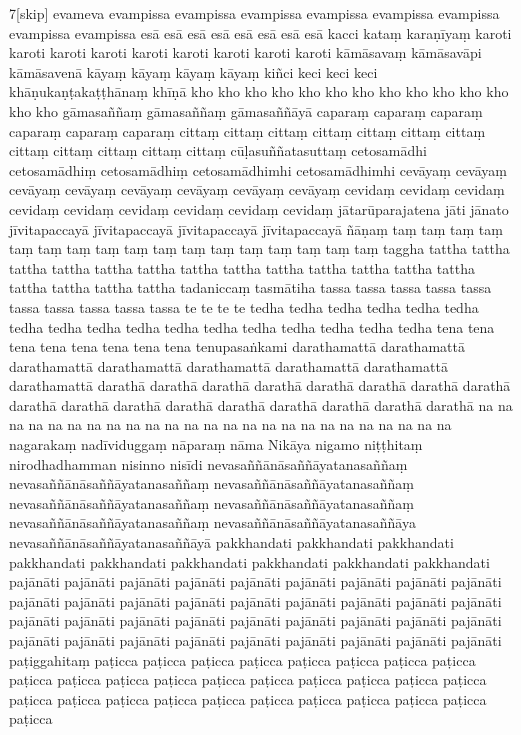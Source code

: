\documentclass[12pt]{article}
\begin{document}
\begin{multicols}{7}[skip]
evameva
evampissa
evampissa
evampissa
evampissa
evampissa
evampissa
evampissa
evampissa
esā
esā
esā
esā
esā
esā
esā
esā
kacci
kataṃ
karaṇīyaṃ
karoti
karoti
karoti
karoti
karoti
karoti
karoti
karoti
karoti
kāmāsavaṃ
kāmāsavāpi
kāmāsavenā
kāyaṃ
kāyaṃ
kāyaṃ
kāyaṃ
kiñci
keci
keci
keci
khāṇukaṇṭakaṭṭhānaṃ
khīṇā
kho
kho
kho
kho
kho
kho
kho
kho
kho
kho
kho
kho
kho
kho
gāmasaññaṃ
gāmasaññaṃ
gāmasaññāyā
caparaṃ
caparaṃ
caparaṃ
caparaṃ
caparaṃ
caparaṃ
cittaṃ
cittaṃ
cittaṃ
cittaṃ
cittaṃ
cittaṃ
cittaṃ
cittaṃ
cittaṃ
cittaṃ
cittaṃ
cittaṃ
cūḷasuññatasuttaṃ
cetosamādhi
cetosamādhiṃ
cetosamādhiṃ
cetosamādhimhi
cetosamādhimhi
cevāyaṃ
cevāyaṃ
cevāyaṃ
cevāyaṃ
cevāyaṃ
cevāyaṃ
cevāyaṃ
cevāyaṃ
cevidaṃ
cevidaṃ
cevidaṃ
cevidaṃ
cevidaṃ
cevidaṃ
cevidaṃ
cevidaṃ
cevidaṃ
jātarūparajatena
jāti
jānato
jīvitapaccayā
jīvitapaccayā
jīvitapaccayā
jīvitapaccayā
ñāṇaṃ
taṃ
taṃ
taṃ
taṃ
taṃ
taṃ
taṃ
taṃ
taṃ
taṃ
taṃ
taṃ
taṃ
taṃ
taṃ
taṃ
taṃ
taggha
tattha
tattha
tattha
tattha
tattha
tattha
tattha
tattha
tattha
tattha
tattha
tattha
tattha
tattha
tattha
tattha
tattha
tadaniccaṃ
tasmātiha
tassa
tassa
tassa
tassa
tassa
tassa
tassa
tassa
tassa
tassa
te
te
te
te
tedha
tedha
tedha
tedha
tedha
tedha
tedha
tedha
tedha
tedha
tedha
tedha
tedha
tedha
tedha
tedha
tedha
tena
tena
tena
tena
tena
tena
tena
tena
tenupasaṅkami
darathamattā
darathamattā
darathamattā
darathamattā
darathamattā
darathamattā
darathamattā
darathamattā
darathā
darathā
darathā
darathā
darathā
darathā
darathā
darathā
darathā
darathā
darathā
darathā
darathā
darathā
darathā
darathā
darathā
na
na
na
na
na
na
na
na
na
na
na
na
na
na
na
na
na
na
na
na
na
na
na
na
na
nagarakaṃ
nadīviduggaṃ
nāparaṃ
nāma
Nikāya
nigamo
niṭṭhitaṃ
nirodhadhamman
nisinno
nisīdi
nevasaññānāsaññāyatanasaññaṃ
nevasaññānāsaññāyatanasaññaṃ
nevasaññānāsaññāyatanasaññaṃ
nevasaññānāsaññāyatanasaññaṃ
nevasaññānāsaññāyatanasaññaṃ
nevasaññānāsaññāyatanasaññaṃ
nevasaññānāsaññāyatanasaññāya
nevasaññānāsaññāyatanasaññāyā
pakkhandati
pakkhandati
pakkhandati
pakkhandati
pakkhandati
pakkhandati
pakkhandati
pakkhandati
pakkhandati
pajānāti
pajānāti
pajānāti
pajānāti
pajānāti
pajānāti
pajānāti
pajānāti
pajānāti
pajānāti
pajānāti
pajānāti
pajānāti
pajānāti
pajānāti
pajānāti
pajānāti
pajānāti
pajānāti
pajānāti
pajānāti
pajānāti
pajānāti
pajānāti
pajānāti
pajānāti
pajānāti
pajānāti
pajānāti
pajānāti
pajānāti
pajānāti
pajānāti
pajānāti
pajānāti
pajānāti
paṭiggahitaṃ
paṭicca
paṭicca
paṭicca
paṭicca
paṭicca
paṭicca
paṭicca
paṭicca
paṭicca
paṭicca
paṭicca
paṭicca
paṭicca
paṭicca
paṭicca
paṭicca
paṭicca
paṭicca
paṭicca
paṭicca
paṭicca
paṭicca
paṭicca
paṭicca
paṭicca
paṭicca
paṭicca
paṭicca
paṭicca

\end{multicols}
\end{document}
